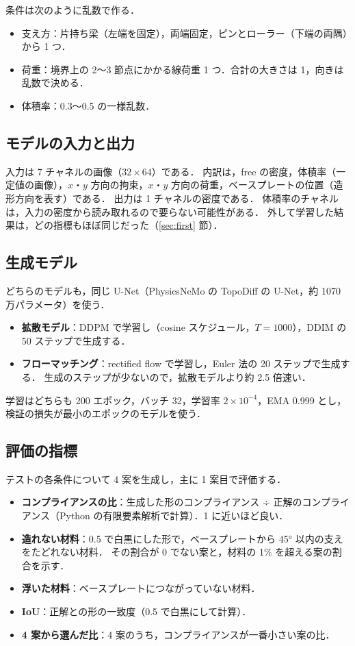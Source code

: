 \documentclass[a4paper,11pt]{ltjsarticle}
\begin{document}
条件は次のように乱数で作る．
\begin{itemize}
  \item 支え方：片持ち梁（左端を固定），両端固定，ピンとローラー（下端の両隅）から 1 つ．
  \item 荷重：境界上の 2〜3 節点にかかる線荷重 1 つ．合計の大きさは 1，向きは乱数で決める．
  \item 体積率：0.3〜0.5 の一様乱数．
\end{itemize}

\subsection{モデルの入力と出力}

入力は 7 チャネルの画像（$32 \times 64$）である．
内訳は，free の密度，体積率（一定値の画像），$x$・$y$ 方向の拘束，$x$・$y$ 方向の荷重，ベースプレートの位置（造形方向を表す）である．
出力は 1 チャネルの密度である．
体積率のチャネルは，入力の密度から読み取れるので要らない可能性がある．
外して学習した結果は，どの指標もほぼ同じだった（\ref{sec:first} 節）．

\subsection{生成モデル}

どちらのモデルも，同じ U-Net（PhysicsNeMo の TopoDiff の U-Net，約 1070 万パラメータ）を使う．
\begin{itemize}
  \item \textbf{拡散モデル}：DDPM で学習し（cosine スケジュール，$T = 1000$），DDIM の 50 ステップで生成する．
  \item \textbf{フローマッチング}：rectified flow で学習し，Euler 法の 20 ステップで生成する．
        生成のステップが少ないので，拡散モデルより約 2.5 倍速い．
\end{itemize}
学習はどちらも 200 エポック，バッチ 32，学習率 $2 \times 10^{-4}$，EMA 0.999 とし，検証の損失が最小のエポックのモデルを使う．

\subsection{評価の指標}

テストの各条件について 4 案を生成し，主に 1 案目で評価する．
\begin{itemize}
  \item \textbf{コンプライアンスの比}：生成した形のコンプライアンス ÷ 正解のコンプライアンス（Python の有限要素解析で計算）．1 に近いほど良い．
  \item \textbf{造れない材料}：0.5 で白黒にした形で，ベースプレートから \ang{45} 以内の支えをたどれない材料．
        その割合が 0 でない案と，材料の 1\% を超える案の割合を示す．
  \item \textbf{浮いた材料}：ベースプレートにつながっていない材料．
  \item \textbf{IoU}：正解との形の一致度（0.5 で白黒にして計算）．
  \item \textbf{4 案から選んだ比}：4 案のうち，コンプライアンスが一番小さい案の比．
\end{itemize}
\end{document}
